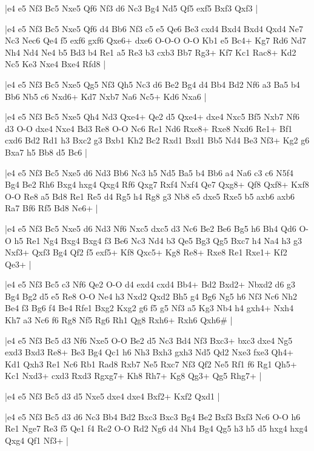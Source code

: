 \whitename{}
\blackname{}
\makegametitle
|e4 e5 Nf3 Bc5 Nxe5 Qf6 Nf3 d6 Nc3 Bg4 Nd5 Qf5 exf5 Bxf3 Qxf3  |

\whitename{}
\blackname{}
\makegametitle
|e4 e5 Nf3 Bc5 Nxe5 Qf6 d4 Bb6 Nf3 c5 e5 Qe6 Be3 cxd4 Bxd4 Bxd4 Qxd4 Ne7 Nc3 Nec6 Qe4 f5 exf6 gxf6 Qxe6+ dxe6 O-O-O O-O Kb1 e5 Bc4+ Kg7 Rd6 Nd7 Nh4 Nd4 Ne4 b5 Bd3 b4 Re1 a5 Re3 b3 cxb3 Bb7 Rg3+ Kf7 Kc1 Rac8+ Kd2 Nc5 Ke3 Nxe4 Bxe4 Rfd8  |

\whitename{}
\blackname{}
\makegametitle
|e4 e5 Nf3 Bc5 Nxe5 Qg5 Nf3 Qh5 Nc3 d6 Be2 Bg4 d4 Bb4 Bd2 Nf6 a3 Ba5 b4 Bb6 Nb5 c6 Nxd6+ Kd7 Nxb7 Na6 Nc5+ Kd6 Nxa6  |

\whitename{}
\blackname{}
\makegametitle
|e4 e5 Nf3 Bc5 Nxe5 Qh4 Nd3 Qxe4+ Qe2 d5 Qxe4+ dxe4 Nxc5 Bf5 Nxb7 Nf6 d3 O-O dxe4 Nxe4 Bd3 Re8 O-O Nc6 Re1 Nd6 Rxe8+ Rxe8 Nxd6 Re1+ Bf1 cxd6 Bd2 Rd1 h3 Bxc2 g3 Bxb1 Kh2 Bc2 Rxd1 Bxd1 Bb5 Nd4 Be3 Nf3+ Kg2 g6 Bxa7 h5 Bb8 d5 Bc6  |

\whitename{}
\blackname{}
\makegametitle
|e4 e5 Nf3 Bc5 Nxe5 d6 Nd3 Bb6 Nc3 h5 Nd5 Ba5 b4 Bb6 a4 Na6 c3 c6 N5f4 Bg4 Be2 Rh6 Bxg4 hxg4 Qxg4 Rf6 Qxg7 Rxf4 Nxf4 Qe7 Qxg8+ Qf8 Qxf8+ Kxf8 O-O Re8 a5 Bd8 Re1 Re5 d4 Rg5 h4 Rg8 g3 Nb8 e5 dxe5 Rxe5 b5 axb6 axb6 Ra7 Bf6 Rf5 Bd8 Ne6+  |

\whitename{}
\blackname{}
\makegametitle
|e4 e5 Nf3 Bc5 Nxe5 d6 Nd3 Nf6 Nxc5 dxc5 d3 Nc6 Be2 Be6 Bg5 h6 Bh4 Qd6 O-O h5 Re1 Ng4 Bxg4 Bxg4 f3 Be6 Nc3 Nd4 b3 Qe5 Bg3 Qg5 Bxc7 h4 Na4 h3 g3 Nxf3+ Qxf3 Bg4 Qf2 f5 exf5+ Kf8 Qxc5+ Kg8 Re8+ Rxe8 Re1 Rxe1+ Kf2 Qe3+  |

\whitename{}
\blackname{}
\makegametitle
|e4 e5 Nf3 Bc5 c3 Nf6 Qe2 O-O d4 exd4 cxd4 Bb4+ Bd2 Bxd2+ Nbxd2 d6 g3 Bg4 Bg2 d5 e5 Re8 O-O Ne4 h3 Nxd2 Qxd2 Bh5 g4 Bg6 Ng5 h6 Nf3 Nc6 Nh2 Be4 f3 Bg6 f4 Be4 Rfe1 Bxg2 Kxg2 g6 f5 g5 Nf3 a5 Kg3 Nb4 h4 gxh4+ Nxh4 Kh7 a3 Nc6 f6 Rg8 Nf5 Rg6 Rh1 Qg8 Rxh6+ Rxh6 Qxh6\#  |

\whitename{}
\blackname{}
\makegametitle
|e4 e5 Nf3 Bc5 d3 Nf6 Nxe5 O-O Be2 d5 Nc3 Bd4 Nf3 Bxc3+ bxc3 dxe4 Ng5 exd3 Bxd3 Re8+ Be3 Bg4 Qc1 h6 Nh3 Bxh3 gxh3 Nd5 Qd2 Nxe3 fxe3 Qh4+ Kd1 Qxh3 Re1 Nc6 Rb1 Rad8 Rxb7 Ne5 Rxc7 Nf3 Qf2 Ne5 Rf1 f6 Rg1 Qh5+ Kc1 Nxd3+ cxd3 Rxd3 Rgxg7+ Kh8 Rh7+ Kg8 Qg3+ Qg5 Rhg7+  |

\whitename{}
\blackname{}
\makegametitle
|e4 e5 Nf3 Bc5 d3 d5 Nxe5 dxe4 dxe4 Bxf2+ Kxf2 Qxd1  |

\whitename{}
\blackname{}
\makegametitle
|e4 e5 Nf3 Bc5 d3 d6 Nc3 Bb4 Bd2 Bxc3 Bxc3 Bg4 Be2 Bxf3 Bxf3 Nc6 O-O h6 Re1 Nge7 Re3 f5 Qe1 f4 Re2 O-O Rd2 Ng6 d4 Nh4 Bg4 Qg5 h3 h5 d5 hxg4 hxg4 Qxg4 Qf1 Nf3+  |

